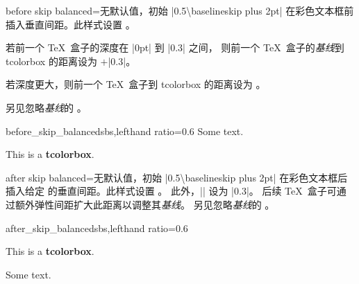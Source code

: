 \begin{docTcbKey}[][doc new={2020-09-25}]{before skip balanced}{=}{无默认值，初始 |0.5\textbackslash baselineskip plus 2pt|}
  在彩色文本框前插入垂直间距。此样式设置 。\par
  若前一个 \TeX\ 盒子的深度在 |0pt| 到 |0.3\baselineskip| 之间，
  则前一个 \TeX\ 盒子的\emph{基线}到 tcolorbox 的距离设为
  $+$|0.3\baselineskip|。\par
  若深度更大，则前一个 \TeX\ 盒子到 tcolorbox 的距离设为 。\par
  另见忽略\emph{基线}的 。

\begin{exdispExample*}{before_skip_balanced}{sbs,lefthand ratio=0.6}
Some text.
\begin{tcolorbox}[before skip balanced=1cm,
    colframe=red!50!white]
  This is a \textbf{tcolorbox}.
\end{tcolorbox}
\end{exdispExample*}
\end{docTcbKey}

\begin{docTcbKey}[][doc new={2020-09-25}]{after skip balanced}{=}{无默认值，初始 |0.5\textbackslash baselineskip plus 2pt|}
  在彩色文本框后插入给定  的垂直间距。此样式设置 。
  此外，|\prevdepth| 设为 |0.3\baselineskip|。
  后续 \TeX\ 盒子可通过额外弹性间距扩大此距离以调整其\emph{基线}。
  另见忽略\emph{基线}的 。

\begin{exdispExample*}{after_skip_balanced}{sbs,lefthand ratio=0.6}
\begin{tcolorbox}[after skip balanced=1cm,
    colframe=red!50!white]
  This is a \textbf{tcolorbox}.
\end{tcolorbox}
Some text.
\end{exdispExample*}
\end{docTcbKey}



